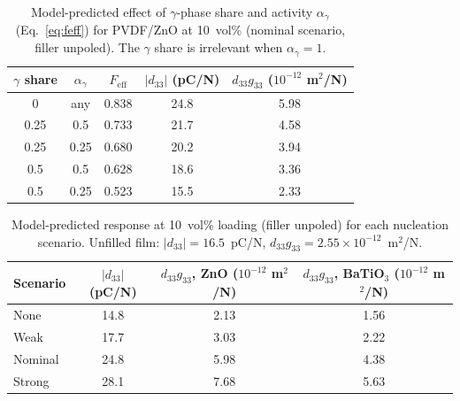 \documentclass[11pt,a4paper]{article}
\newcommand{\BTO}{BaTiO$_3$}
\newcommand{\dt}{d_{33}}
\begin{document}
\begin{table}[htbp]
\centering
\caption{Model-predicted effect of $\gamma$-phase share and activity $\alpha_\gamma$ (Eq.~\ref{eq:feff}) for PVDF/ZnO at 10~vol\% (nominal scenario, filler unpoled). The $\gamma$ share is irrelevant when $\alpha_\gamma=1$.}
\label{tab:bg}
\small
\begin{tabular}{ccccc}
\toprule
$\gamma$ share & $\alpha_\gamma$ & $F_{\mathrm{eff}}$ & $|\dt|$ (pC/N) & $\dt g_{33}$ ($10^{-12}$ m$^2$/N) \\
\midrule
0 & any & 0.838 & 24.8 & 5.98 \\
0.25 & 0.5 & 0.733 & 21.7 & 4.58 \\
0.25 & 0.25 & 0.680 & 20.2 & 3.94 \\
0.5 & 0.5 & 0.628 & 18.6 & 3.36 \\
0.5 & 0.25 & 0.523 & 15.5 & 2.33 \\
\bottomrule
\end{tabular}
\end{table}

\begin{table}[htbp]
\centering
\caption{Model-predicted response at 10~vol\% loading (filler unpoled) for each nucleation scenario. Unfilled film: $|\dt|=16.5$~pC/N, $\dt g_{33}=2.55\times10^{-12}$~m$^2$/N.}
\label{tab:senstab}
\small
\begin{tabular}{lccc}
\toprule
Scenario & $|\dt|$ (pC/N) & $\dt g_{33}$, ZnO ($10^{-12}$ m$^2$/N) & $\dt g_{33}$, \BTO{} ($10^{-12}$ m$^2$/N) \\
\midrule
None & 14.8 & 2.13 & 1.56 \\
Weak & 17.7 & 3.03 & 2.22 \\
Nominal & 24.8 & 5.98 & 4.38 \\
Strong & 28.1 & 7.68 & 5.63 \\
\bottomrule
\end{tabular}
\end{table}
\end{document}
